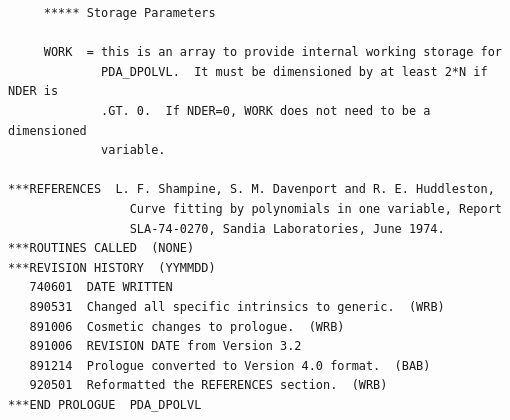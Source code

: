 \documentclass[11pt,twoside]{article}
\begin{document}
\begin{verbatim}
     ***** Storage Parameters

     WORK  = this is an array to provide internal working storage for
             PDA_DPOLVL.  It must be dimensioned by at least 2*N if NDER is
             .GT. 0.  If NDER=0, WORK does not need to be a dimensioned
             variable.

***REFERENCES  L. F. Shampine, S. M. Davenport and R. E. Huddleston,
                 Curve fitting by polynomials in one variable, Report
                 SLA-74-0270, Sandia Laboratories, June 1974.
***ROUTINES CALLED  (NONE)
***REVISION HISTORY  (YYMMDD)
   740601  DATE WRITTEN
   890531  Changed all specific intrinsics to generic.  (WRB)
   891006  Cosmetic changes to prologue.  (WRB)
   891006  REVISION DATE from Version 3.2
   891214  Prologue converted to Version 4.0 format.  (BAB)
   920501  Reformatted the REFERENCES section.  (WRB)
***END PROLOGUE  PDA_DPOLVL
\end{verbatim}
\end{document}

